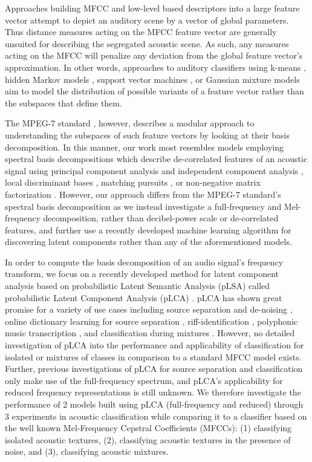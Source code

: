 \documentclass[a4paper,10pt,final]{ThesisStyle}
\begin{document}
Approaches building MFCC and low-level based descriptors into a large feature vector attempt to depict an auditory scene by a vector of global parameters. Thus distance measures acting on the MFCC feature vector are generally unsuited for describing the segregated acoustic scene.  As such, any measures acting on the MFCC will penalize any deviation from the global feature vector's approximation.  In other words, approaches to auditory classifiers using k-means \cite{Harma2005,Eronen2006,Allamanche2001}, hidden Markov models \cite{Eronen2006,Mesaros2010}, support vector machines \cite{Guo2003a}, or Gaussian mixture models \cite{Wang2011,Aucouturier2007a,Pampalk2006a} aim to model the distribution of possible variants of a feature vector rather than the subspaces that define them.  

The MPEG-7 standard \cite{Casey2001a,Manjunath2002}, however, describes a modular approach to understanding the subspaces of such feature vectors by looking at their basis decomposition.  In this manner, our work most resembles models employing spectral basis decompositions which describe de-correlated features of an acoustic signal using principal component analysis and independent component analysis \cite{Casey2001a,Xiong2003,Kim2004}, local discriminant bases \cite{Su2011}, matching pursuits \cite{Chu2009a}, or non-negative matrix factorization \cite{Raj2010}.  However, our approach differs from the MPEG-7 standard's spectral basis decomposition \cite{Casey2001a} as we instead investigate a full-frequency and Mel-frequency decomposition, rather than decibel-power scale or de-correlated features, and further use a recently developed machine learning algorithm for discovering latent components rather than any of the aforementioned models.

In order to compute the basis decomposition of an audio signal's frequency transform, we focus on a recently developed method for latent component analysis based on probabilistic Latent Semantic Analysis (pLSA) \cite{Hofmann1999} called probabilistic Latent Component Analysis (pLCA) \cite{SmaragdisRajShashanka}.   pLCA has shown great promise for a variety of use cases including source separation and de-noising \cite{Smaragdis2007a,Smaragdis2007}, online dictionary learning for source separation \cite{Duan2012}, riff-identification \cite{Weiss2011}, polyphonic music transcription \cite{Benetos2011}, and classification during mixtures \cite{Nam2012}.  However, no detailed investigation of pLCA into the performance and applicability of classification for isolated or mixtures of classes in comparison to a standard MFCC model exists.  Further, previous investigations of pLCA for source separation and classification only make use of the full-frequency spectrum, and pLCA's applicability for reduced frequency representations is still unknown.  We therefore investigate the performance of 2 models built using pLCA (full-frequency and reduced) through 3 experiments in acoustic classification while comparing it to a classifier based on the well known Mel-Frequency Cepstral Coefficients (MFCCs): (1) classifying isolated acoustic textures, (2), classifying acoustic textures in the presence of noise, and (3), classifying acoustic mixtures.  
\end{document}
